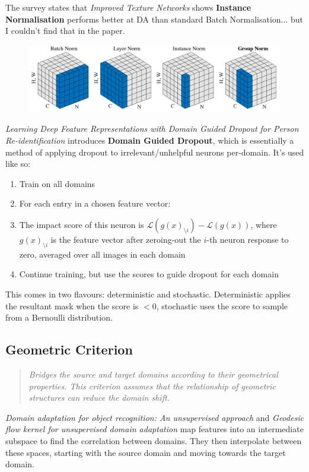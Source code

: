 \documentclass{report}
\newcommand{\quoteit}[1]{\begin{quote}\textit{#1}\end{quote}}
\begin{document}
The survey\parencite{deepdomainsurvey} states that \textit{Improved Texture Networks}\parencite{texturenets} shows \textbf{Instance Normalisation} performs better at DA than standard Batch Normalisation... but I couldn't find that in the paper. \\
\begin{figure}[h]
\centering
\includegraphics[width=14cm]{imgs/norm-types}
\caption{}
\label{fig:norm-types}
\end{figure}


\textit{Learning Deep Feature Representations with Domain Guided Dropout for
	Person Re-identification}\parencite{domainguideddropout} introduces \textbf{Domain Guided Dropout}, which is essentially a method of applying dropout to irrelevant/unhelpful neurons per-domain. It's used like so:
\begin{enumerate}
	\item Train on all domains
	\item For each entry in a chosen feature vector:
	\item The impact score of this neuron is $\mathcal{L}(g(x)_{\setminus i})-\mathcal{L}(g(x))$, where $g(x)_{\setminus i}$ is the feature vector after zeroing-out the $i$-th neuron response to zero, averaged over all images in each domain
	\item Continue training, but use the scores to guide dropout for each domain
\end{enumerate}
This comes in two flavours: deterministic and stochastic. Deterministic applies the resultant mask when the score is $<0$, stochastic uses the score to sample from a Bernoulli distribution.

\subsection{Geometric Criterion}
\quoteit{Bridges the source and target domains according to their geometrical properties. This criterion assumes that the relationship of geometric structures can reduce the domain shift.}
\textit{Domain adaptation for object recognition: An unsupervised approach}\parencite{domainadaptforobj} and \textit{Geodesic flow kernel for unsupervised domain adaptation}\parencite{geodesicflowkernel} map features into an intermediate subspace to find the correlation between domains. They then interpolate between these spaces, starting with the source domain and moving towards the target domain.
\end{document}

